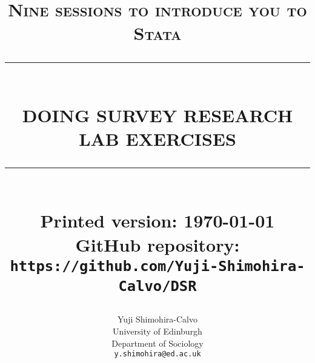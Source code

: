 
\newcommand{\horule}[1]{\rule{\linewidth}{#1}}


\makeatletter
\def\printtitle{
	{\centering \@title \par}}
\makeatother


\makeatletter
\def\printauthor{
	{\centering \large \@author}}
\makeatother


\title{\textsc{Nine sessions to introduce you to Stata\textregistered}
	\\ [1.0cm]
	\horule{0.5pt} \\ [0.5cm]
	\LARGE \textbf{\uppercase{Doing Survey Research \\ Lab Exercises}}
	\horule{2pt} \\ [1.0cm]
	\normalsize Printed version: \today \\
	\normalsize GitHub repository: \texttt{https://github.com/Yuji-Shimohira-Calvo/DSR}
}

\author{
	Yuji Shimohira-Calvo \\
	University of Edinburgh \\
	Department of Sociology \\
	\texttt{y.shimohira@ed.ac.uk} \\
}
